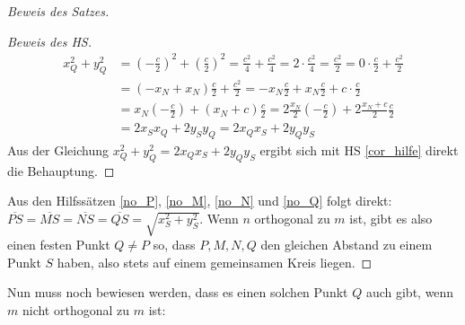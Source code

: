 \begin{proof}[Beweis des Satzes]
\begin{proof}[Beweis des HS]
        \begin{align*}
            x_Q^2+y_Q^2&=\left(-\frac{c}{2}\right)^2+\left(\frac{c}{2}\right)^2=\frac{c^2}{4}+\frac{c^2}{4}
            =2\cdot \frac{c^2}{4}=\frac{c^2}{2}=0\cdot \frac{c}{2}+\frac{c^2}{2}\\
            &=(-x_N+x_N)\frac{c}{2}+\frac{c^2}{2}=-x_N\frac{c}{2}+x_N\frac{c}{2}+c\cdot\frac{c}{2}\\
            &=x_N\left(-\frac{c}{2}\right)+(x_N+c)\frac{c}{2}=2\frac{x_N}{2}
            \left(-\frac{c}{2}\right)+2\frac{x_N+c}{2}\frac{c}{2}\\
            &=2x_Sx_Q+2y_Sy_Q=2x_Qx_S+2y_Qy_S
        \end{align*}
        Aus der Gleichung $x_Q^2+y_Q^2=2x_Qx_S+2y_Qy_S$ ergibt sich mit HS \ref{cor_hilfe} direkt die Behauptung.
    \end{proof}
    Aus den Hilfssätzen \ref{no_P}, \ref{no_M}, \ref{no_N} und \ref{no_Q} folgt direkt: 
    $\overline{PS}=\overline{MS}=\overline{NS}=\overline{QS}=\sqrt{x_S^2+y_S^2}$. Wenn $n$ orthogonal zu $m$ ist, 
    gibt es also einen festen Punkt $Q\neq P$ so, dass $P, M, N, Q$ den gleichen Abstand zu einem Punkt $S$ haben, 
    also stets auf einem gemeinsamen Kreis liegen.
    \renewcommand{\qedsymbol}{$\blacksquare$}
\end{proof}

Nun muss noch bewiesen werden, dass es einen solchen Punkt $Q$ auch gibt, wenn $m$ nicht orthogonal zu $m$ ist:

